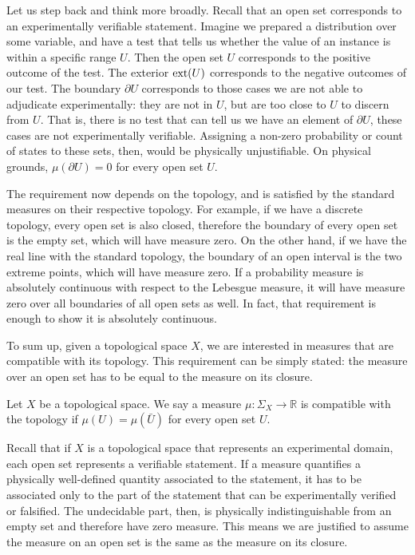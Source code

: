 Let us step back and think more broadly. Recall that an open set corresponds to an experimentally verifiable statement. Imagine we prepared a distribution over some variable, and have a test that tells us whether the value of an instance is within a specific range $U$. Then the open set $U$ corresponds to the positive outcome of the test. The exterior $\operatorname{ext}(U)$ corresponds to the negative outcomes of our test. The boundary $\partial U$ corresponds to those cases we are not able to adjudicate experimentally: they are not in $U$, but are too close to $U$ to discern from $U$. That is, there is no test that can tell us we have an element of $\partial U$, these cases are not experimentally verifiable. Assigning a non-zero probability or count of states to these sets, then, would be physically unjustifiable. On physical grounds, $\mu(\partial U) = 0$ for every open set $U$.

The requirement now depends on the topology, and is satisfied by the standard measures on their respective topology. For example, if we have a discrete topology, every open set is also closed, therefore the boundary of every open set is the empty set, which will have measure zero. On the other hand, if we have the real line with the standard topology, the boundary of an open interval is the two extreme points, which will have measure zero. If a probability measure is absolutely continuous with respect to the Lebesgue measure, it will have measure zero over all boundaries of all open sets as well. In fact, that requirement is enough to show it is absolutely continuous.

To sum up, given a topological space $X$, we are interested in measures that are compatible with its topology. This requirement can be simply stated: the measure over an open set has to be equal to the measure on its closure. 

\begin{mathSection}
\begin{defn}
	Let $X$ be a topological space. We say a measure $\mu : \Sigma_X \to \mathbb{R}$ is compatible with the topology if $\mu(U) = \mu(\bar{U})$ for every open set $U$.
\end{defn}
\begin{justification}
	Recall that if $X$ is a topological space that represents an experimental domain, each open set represents a verifiable statement. If a measure quantifies a physically well-defined quantity associated to the statement, it has to be associated only to the part of the statement that can be experimentally verified or falsified. The undecidable part, then, is physically indistinguishable from an empty set and therefore have zero measure. This means we are justified to assume the measure on an open set is the same as the measure on its closure.
\end{justification}
\end{mathSection}

